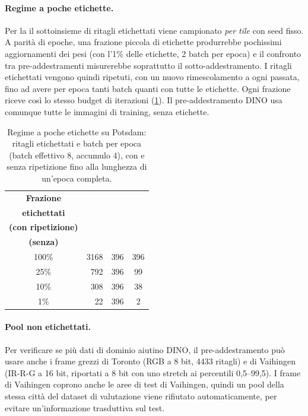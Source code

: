 \paragraph{Regime a poche etichette.}
Per la  il sottoinsieme di ritagli etichettati viene campionato \emph{per tile} con seed
fisso. A parità di epoche, una frazione piccola di etichette produrrebbe pochissimi
aggiornamenti dei pesi (con l'1\% delle etichette, 2 batch per epoca) e il confronto tra
pre-addestramenti misurerebbe soprattutto il sotto-addestramento. I ritagli etichettati vengono
quindi ripetuti, con un nuovo rimescolamento a ogni passata, fino ad avere per epoca tanti batch
quanti con tutte le etichette. Ogni frazione riceve così lo stesso budget di iterazioni
(\cref{tab:frazioni}). Il pre-addestramento DINO usa comunque tutte le immagini di training,
senza etichette.

\begin{table}[t]
  \centering
  \small
  \caption[Regime a poche etichette su Potsdam]{Regime a poche etichette su Potsdam: ritagli
    etichettati e batch per epoca (batch effettivo 8, accumulo 4), con e senza ripetizione fino
    alla lunghezza di un'epoca completa.}
  \label{tab:frazioni}
  \begin{tabular}{|c|r|c|c|}
    \hline
    \textbf{Frazione} & \makecell{\textbf{Ritagli}\\\textbf{etichettati}} & \makecell{\textbf{Batch/epoca}\\\textbf{(con ripetizione)}} & \makecell{\textbf{Batch/epoca}\\\textbf{(senza)}} \\
    \hline
    100\% & \num{3168} & 396 & 396 \\
    25\%  & 792  & 396 & 99 \\
    10\%  & 308  & 396 & 38 \\
    1\%   & 22   & 396 & 2 \\
    \hline
  \end{tabular}
\end{table}

\paragraph{Pool non etichettati.}
Per verificare se più dati di dominio aiutino DINO, il pre-addestramento può usare anche i frame
grezzi di Toronto (RGB a 8 bit, \num{4433} ritagli) e di Vaihingen (IR-R-G a 16 bit, riportati a
8 bit con uno stretch ai percentili 0,5--99,5). I frame di Vaihingen coprono anche le aree di
test di Vaihingen, quindi un pool della stessa città del dataset di valutazione viene rifiutato
automaticamente, per evitare un'informazione trasduttiva sul test.

